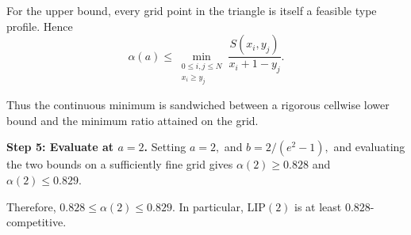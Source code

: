 For the upper bound, every grid point in the triangle is itself a feasible type profile. Hence 
\[
\alpha(a)
\le
\min_{\substack{0\le i,j\le N\\x_i\ge y_j}}
\frac{S(x_i,y_j)}{x_i+1-y_j}.
\]

Thus the continuous minimum is sandwiched between a rigorous cellwise lower bound and the minimum ratio attained on the grid.

\textbf{Step 5: Evaluate at $a=2$.}
Setting $a=2,$ and $b={2}/({e^2-1}),$ and evaluating the two bounds on a sufficiently fine grid gives $\alpha(2)\ge0.828$ and $\alpha(2)\le0.829.$

Therefore, $\boxed{0.828\le\alpha(2)\le0.829.}$
In particular, $\mathrm{LIP}(2)$ is at least $0.828$-competitive.









